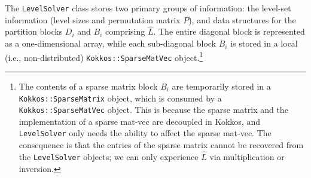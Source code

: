 \documentclass[12pt]{article}
\begin{document}
The \texttt{LevelSolver} class stores two primary groups of information: the level-set information (level sizes and permutation matrix $P$), and data structures for the partition blocks $D_i$ and $B_i$ comprising $\hat{L}$. The entire diagonal block is represented as a one-dimensional array, while each sub-diagonal block $B_i$ is stored in a local (i.e., non-distributed) \texttt{Kokkos::SparseMatVec} object.\footnote{The contents of a sparse matrix block $B_i$ are temporarily stored in a \texttt{Kokkos::SparseMatrix} object, which is consumed by a \texttt{Kokkos::SparseMatVec} object. This is because the sparse matrix and the implementation of a sparse mat-vec are decoupled in Kokkos, and \texttt{LevelSolver} only needs the ability to affect the sparse mat-vec. The consequence is that the entries of the sparse matrix cannot be recovered from the \texttt{LevelSolver} objects; we can only experience $\hat{L}$ via multiplication or inversion.} 
\end{document}
